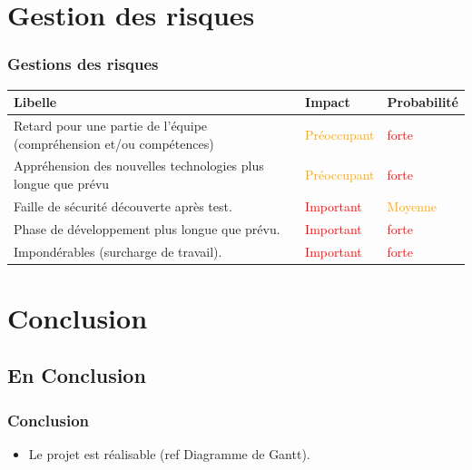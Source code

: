 \documentclass[xcolor=table]{beamer}
\begin{document}
\section{Gestion des risques}

\begin{frame}[fragile]
\frametitle{Gestions des risques}
  \begin{center}
  \begin{tabular}{| p{5cm} | p{2cm} |p{2cm} |}
  \hline
  \rowcolor{lightgray}Libelle & Impact & Probabilité\\ \hline
  Retard pour une partie de l'équipe (compréhension et/ou compétences) & \textcolor{orange}{Préoccupant} & \textcolor{red}{forte}\\ \hline
  Appréhension des nouvelles technologies plus longue que prévu & \textcolor{orange}{Préoccupant} & \textcolor{red}{forte}\\ \hline
  Faille de sécurité découverte après test. & \textcolor{red}{Important} & \textcolor{orange}{Moyenne}\\ \hline
  Phase de développement plus longue que prévu.& \textcolor{red}{Important} & \textcolor{red}{forte}\\ \hline
  Impondérables (surcharge de travail).& \textcolor{red}{Important} & \textcolor{red}{forte}\\ \hline
  \end{tabular}
  \end{center}
\end{frame}

\section{Conclusion}

\subsection{En Conclusion}

\begin{frame}
\frametitle{Conclusion}
  \begin{itemize}
   \item Le projet est réalisable (ref Diagramme de Gantt).
  \end{itemize}
\end{frame}
\end{document}
